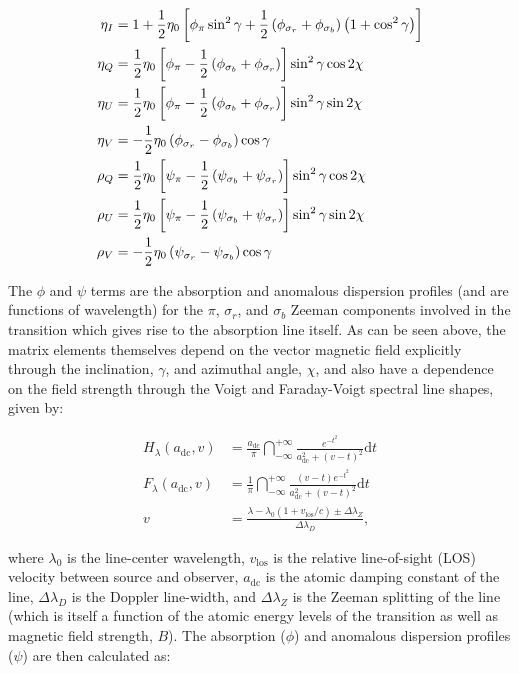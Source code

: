\documentclass[11pt]{article}
\begin{document}
\begin{align}
\eta_{I} &= 1 + \frac{1}{2}\eta_{0}\left[\phi_{\pi}\sin^{2}\gamma + \frac{1}{2}\left(\phi_{\sigma_{r}} + \phi_{\sigma_{b}}\right)\left(1 + \cos^{2}\gamma\right)\right]\\
\eta_{Q} &= \frac{1}{2}\eta_{0}\left[\phi_{\pi} - \frac{1}{2}\left(\phi_{\sigma_{b}} + \phi_{\sigma_{r}}\right)\right]\sin^{2}\gamma\cos2\chi\\
\eta_{U} &= \frac{1}{2}\eta_{0}\left[\phi_{\pi} - \frac{1}{2}\left(\phi_{\sigma_{b}} + \phi_{\sigma_{r}}\right)\right]\sin^{2}\gamma\sin2\chi\\
\eta_{V} &= -\frac{1}{2}\eta_{0}\left(\phi_{\sigma_{r}} - \phi_{\sigma_{b}}\right)\cos\gamma\\
\rho_{Q} &= \frac{1}{2}\eta_{0}\left[\psi_{\pi} - \frac{1}{2}\left(\psi_{\sigma_{b}} + \psi_{\sigma_{r}}\right)\right]\sin^{2}\gamma\cos2\chi\\
\rho_{U} &= \frac{1}{2}\eta_{0}\left[\psi_{\pi} - \frac{1}{2}\left(\psi_{\sigma_{b}} + \psi_{\sigma_{r}}\right)\right]\sin^{2}\gamma\sin2\chi\\
\rho_{V} &= -\frac{1}{2}\eta_{0}\left(\psi_{\sigma_{r}} - \psi_{\sigma_{b}}\right)\cos\gamma
\end{align}

The $\phi$ and $\psi$ terms are the absorption and anomalous dispersion profiles (and are functions of wavelength) for the 
$\pi$, $\sigma_{r}$, and $\sigma_{b}$ Zeeman components involved in the transition which gives rise to the absorption
line itself.  As can be seen above, the matrix elements themselves depend on the vector magnetic field explicitly through
the inclination, $\gamma$, and azimuthal angle, $\chi$, and also have a dependence on the field strength through the Voigt
and Faraday-Voigt spectral line shapes, given by:

\begin{align}
H_{\lambda}(a_{\mathrm{dc}},v) &= \frac{a_{\mathrm{dc}}}{\pi}\dint_{-\infty}^{+\infty}
        \frac{e^{-t^{2}}}{a_{\mathrm{dc}}^{2} + (v-t)^{2}}\mathrm{d}t\\
F_{\lambda}(a_{\mathrm{dc}},v) &= \frac{1}{\pi}\dint_{-\infty}^{+\infty}
        \frac{(v-t)e^{-t^{2}}}{a_{\mathrm{dc}}^{2} + (v-t)^{2}}\mathrm{d}t\\
v &= \frac{\lambda - \lambda_{0}(1+v_{\mathrm{los}}/c) \pm \Delta\lambda_{Z}}{\Delta\lambda_{D}},\label{eq:v}
\end{align}

where $\lambda_{0}$ is the line-center wavelength, $v_{\mathrm{los}}$ is the relative line-of-sight (LOS)
velocity between source and observer, $a_{\mathrm{dc}}$ is the atomic damping constant of the line,
$\Delta\lambda_{D}$ is the Doppler line-width, and $\Delta\lambda_{Z}$ is the Zeeman splitting of the line
(which is itself a function of the atomic energy levels of the transition as well as magnetic field strength,
$B$).  The absorption ($\phi$) and anomalous dispersion profiles ($\psi$) are then calculated as:
\end{document}
